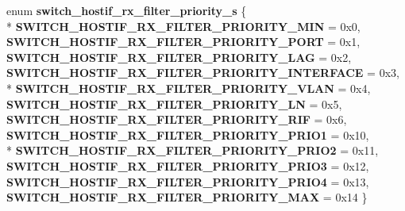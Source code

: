 \begin{DoxyCompactItemize}
\item 
\hypertarget{group__HostInterface_ga55d8ada64060e816d572fc482f3c91df}{enum {\bfseries switch\+\_\+hostif\+\_\+rx\+\_\+filter\+\_\+priority\+\_\+s} \{ \\*
{\bfseries S\+W\+I\+T\+C\+H\+\_\+\+H\+O\+S\+T\+I\+F\+\_\+\+R\+X\+\_\+\+F\+I\+L\+T\+E\+R\+\_\+\+P\+R\+I\+O\+R\+I\+T\+Y\+\_\+\+M\+I\+N} = 0x0, 
{\bfseries S\+W\+I\+T\+C\+H\+\_\+\+H\+O\+S\+T\+I\+F\+\_\+\+R\+X\+\_\+\+F\+I\+L\+T\+E\+R\+\_\+\+P\+R\+I\+O\+R\+I\+T\+Y\+\_\+\+P\+O\+R\+T} = 0x1, 
{\bfseries S\+W\+I\+T\+C\+H\+\_\+\+H\+O\+S\+T\+I\+F\+\_\+\+R\+X\+\_\+\+F\+I\+L\+T\+E\+R\+\_\+\+P\+R\+I\+O\+R\+I\+T\+Y\+\_\+\+L\+A\+G} = 0x2, 
{\bfseries S\+W\+I\+T\+C\+H\+\_\+\+H\+O\+S\+T\+I\+F\+\_\+\+R\+X\+\_\+\+F\+I\+L\+T\+E\+R\+\_\+\+P\+R\+I\+O\+R\+I\+T\+Y\+\_\+\+I\+N\+T\+E\+R\+F\+A\+C\+E} = 0x3, 
\\*
{\bfseries S\+W\+I\+T\+C\+H\+\_\+\+H\+O\+S\+T\+I\+F\+\_\+\+R\+X\+\_\+\+F\+I\+L\+T\+E\+R\+\_\+\+P\+R\+I\+O\+R\+I\+T\+Y\+\_\+\+V\+L\+A\+N} = 0x4, 
{\bfseries S\+W\+I\+T\+C\+H\+\_\+\+H\+O\+S\+T\+I\+F\+\_\+\+R\+X\+\_\+\+F\+I\+L\+T\+E\+R\+\_\+\+P\+R\+I\+O\+R\+I\+T\+Y\+\_\+\+L\+N} = 0x5, 
{\bfseries S\+W\+I\+T\+C\+H\+\_\+\+H\+O\+S\+T\+I\+F\+\_\+\+R\+X\+\_\+\+F\+I\+L\+T\+E\+R\+\_\+\+P\+R\+I\+O\+R\+I\+T\+Y\+\_\+\+R\+I\+F} = 0x6, 
{\bfseries S\+W\+I\+T\+C\+H\+\_\+\+H\+O\+S\+T\+I\+F\+\_\+\+R\+X\+\_\+\+F\+I\+L\+T\+E\+R\+\_\+\+P\+R\+I\+O\+R\+I\+T\+Y\+\_\+\+P\+R\+I\+O1} = 0x10, 
\\*
{\bfseries S\+W\+I\+T\+C\+H\+\_\+\+H\+O\+S\+T\+I\+F\+\_\+\+R\+X\+\_\+\+F\+I\+L\+T\+E\+R\+\_\+\+P\+R\+I\+O\+R\+I\+T\+Y\+\_\+\+P\+R\+I\+O2} = 0x11, 
{\bfseries S\+W\+I\+T\+C\+H\+\_\+\+H\+O\+S\+T\+I\+F\+\_\+\+R\+X\+\_\+\+F\+I\+L\+T\+E\+R\+\_\+\+P\+R\+I\+O\+R\+I\+T\+Y\+\_\+\+P\+R\+I\+O3} = 0x12, 
{\bfseries S\+W\+I\+T\+C\+H\+\_\+\+H\+O\+S\+T\+I\+F\+\_\+\+R\+X\+\_\+\+F\+I\+L\+T\+E\+R\+\_\+\+P\+R\+I\+O\+R\+I\+T\+Y\+\_\+\+P\+R\+I\+O4} = 0x13, 
{\bfseries S\+W\+I\+T\+C\+H\+\_\+\+H\+O\+S\+T\+I\+F\+\_\+\+R\+X\+\_\+\+F\+I\+L\+T\+E\+R\+\_\+\+P\+R\+I\+O\+R\+I\+T\+Y\+\_\+\+M\+A\+X} = 0x14
 \}}\label{group__HostInterface_ga55d8ada64060e816d572fc482f3c91df}


\end{DoxyCompactItemize}
